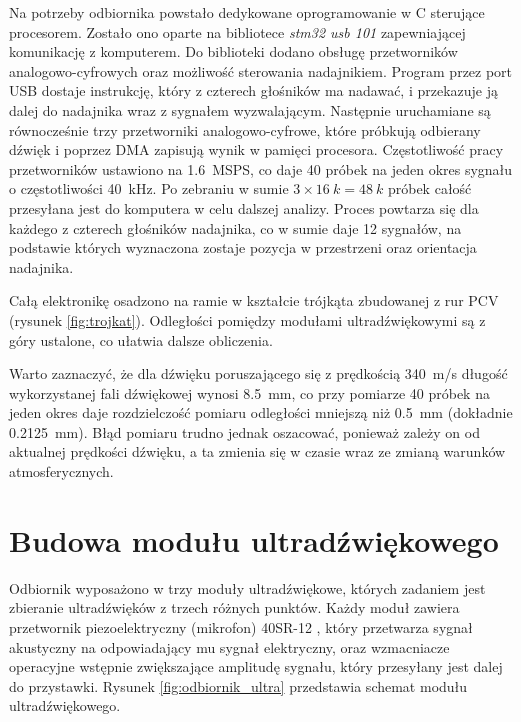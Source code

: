 Na potrzeby odbiornika powstało dedykowane oprogramowanie w C sterujące procesorem.
Zostało ono oparte na bibliotece \textit{stm32 usb 101} \cite{bib:stm32_usb_101} zapewniającej komunikację z komputerem. 
Do biblioteki dodano obsługę przetworników analogowo-cyfrowych oraz możliwość sterowania nadajnikiem.
Program przez port USB dostaje instrukcję, który z czterech głośników ma nadawać, i przekazuje ją
dalej do nadajnika wraz z sygnałem wyzwalającym. Następnie uruchamiane są równocześnie trzy przetworniki analogowo-cyfrowe, które 
próbkują odbierany dźwięk i poprzez DMA zapisują wynik w pamięci procesora.
Częstotliwość pracy przetworników ustawiono na \SI{1,6}{MSPS}, co daje 40 próbek na jeden okres sygnału o częstotliwości \SI{40}{kHz}.
Po zebraniu w sumie $3\times\SI{16}{k}=\SI{48}{k}$ próbek całość przesyłana jest do komputera w celu dalszej analizy.
Proces powtarza się dla każdego z czterech głośników nadajnika, 
co w sumie daje 12 sygnałów, na podstawie których wyznaczona zostaje 
pozycja w przestrzeni oraz orientacja nadajnika.

Całą elektronikę osadzono na ramie w kształcie trójkąta zbudowanej z rur PCV  (rysunek \ref{fig:trojkat}). 
Odległości pomiędzy modułami ultradźwiękowymi są z góry ustalone, co ułatwia dalsze obliczenia.

Warto zaznaczyć, że dla dźwięku poruszającego się z prędkością \SI{340}{m/s} długość wykorzystanej 
fali dźwiękowej wynosi \SI{8.5}{mm}, co przy 
pomiarze 40 próbek na jeden okres daje rozdzielczość pomiaru odległości mniejszą niż \SI{0.5}{mm} (dokładnie \SI{0.2125}{mm}).
Błąd pomiaru trudno jednak oszacować, ponieważ  zależy on od aktualnej prędkości
dźwięku, a ta zmienia się w czasie wraz ze zmianą warunków atmosferycznych.



\section{Budowa modułu ultradźwiękowego}

Odbiornik wyposażono w trzy moduły ultradźwiękowe, których zadaniem jest 
zbieranie ultradźwięków z trzech różnych  punktów.
Każdy moduł zawiera przetwornik piezoelektryczny (mikrofon) 40SR-12 \cite{bib:40ST12},
który przetwarza sygnał akustyczny na odpowiadający mu sygnał elektryczny, oraz wzmacniacze operacyjne 
wstępnie zwiększające amplitudę sygnału, który przesyłany jest dalej do przystawki.
Rysunek \ref{fig:odbiornik_ultra} przedstawia schemat modułu ultradźwiękowego.

